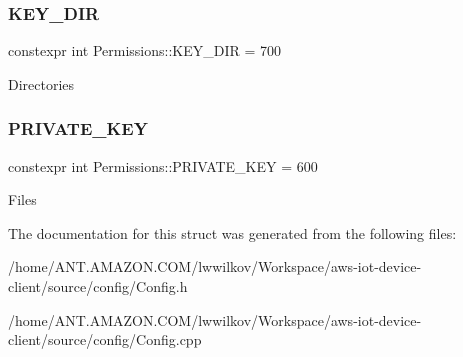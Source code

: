 \subsubsection{\texorpdfstring{K\+E\+Y\+\_\+\+D\+IR}{KEY\_DIR}}
{\footnotesize\ttfamily constexpr int Permissions\+::\+K\+E\+Y\+\_\+\+D\+IR = 700\hspace{0.3cm}{\ttfamily [static]}}

Directories \mbox{\label{struct_aws_1_1_iot_1_1_device_client_1_1_permissions_a9ddbfdd526c7cc2643e763215a94cd84}} 
\subsubsection{\texorpdfstring{P\+R\+I\+V\+A\+T\+E\+\_\+\+K\+EY}{PRIVATE\_KEY}}
{\footnotesize\ttfamily constexpr int Permissions\+::\+P\+R\+I\+V\+A\+T\+E\+\_\+\+K\+EY = 600\hspace{0.3cm}{\ttfamily [static]}}

Files 

The documentation for this struct was generated from the following files\+:\begin{DoxyCompactItemize}
\item 
/home/\+A\+N\+T.\+A\+M\+A\+Z\+O\+N.\+C\+O\+M/lwwilkov/\+Workspace/aws-\/iot-\/device-\/client/source/config/Config.\+h\item 
/home/\+A\+N\+T.\+A\+M\+A\+Z\+O\+N.\+C\+O\+M/lwwilkov/\+Workspace/aws-\/iot-\/device-\/client/source/config/Config.\+cpp\end{DoxyCompactItemize}
